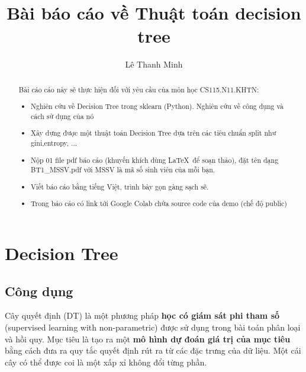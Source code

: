 \documentclass[lineno]{biometrika}
\begin{document}



\title{Bài báo cáo về Thuật toán decision tree}

\author{Lê Thanh Minh}

\maketitle
\begin{abstract}
Bài cáo cáo này sẽ thực hiện đối với yêu cầu của môn học CS115.N11.KHTN:
\begin{itemize}
    \item Nghiên cứu về Decision Tree trong sklearn (Python). Nghiên cứu về công dụng và cách sử dụng của nó 
    \item Xây dựng được một thuật toán Decision Tree dựa trên các tiêu chuẩn split như gini,entropy, ...
    \item Nộp 01 file pdf báo cáo (khuyến khích dùng \LaTeX \  để soạn thảo), đặt tên dạng BT1\_MSSV.pdf với MSSV là mã số sinh viên của mỗi bạn.
    \item Viết báo cáo bằng tiếng Việt, trình bày gọn gàng sạch sẽ.
    \item Trong báo cáo có link tới Google Colab chứa source code của demo (chế độ public)
\end{itemize}
\end{abstract}


\section{Decision Tree}
\subsection{Công dụng}
Cây quyết định (DT) là một phương pháp\textbf{ học có giám sát phi tham số} (supervised learning with non-parametric) được sử dụng trong bài toán phân loại và hồi quy. Mục tiêu là tạo ra một\textbf{ mô hình dự đoán giá trị của mục tiêu} bằng cách đưa ra quy tắc quyết định rút ra từ các đặc trưng của dữ liệu. Một cái cây có thể được coi là một xấp xỉ không đổi từng phần.
\end{document}
